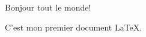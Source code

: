 \documentclass{presentation}
\begin{document}
Bonjour tout le monde!

C'est mon premier document LaTeX.
\end{document}
